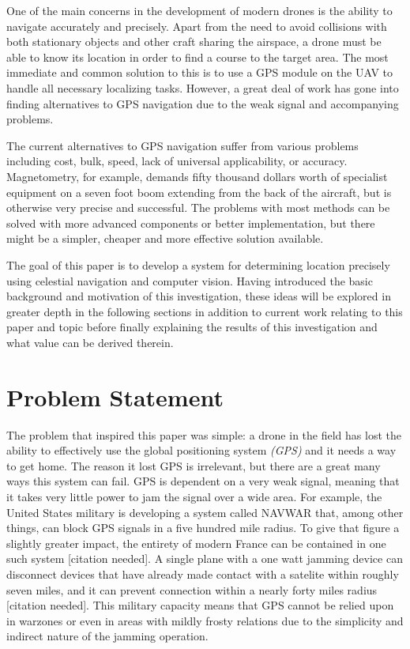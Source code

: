 \documentclass[]{article}
\begin{document}
    One of the main concerns in the development of modern drones is the ability to navigate accurately and precisely. Apart from the need to avoid collisions with both stationary objects and other craft sharing the airspace, a drone must be able to know its location in order to find a course to the target area. The most immediate and common solution to this is to use a GPS module on the UAV to handle all necessary localizing tasks. However, a great deal of work has gone into finding alternatives to GPS navigation due to the weak signal and accompanying problems.\newline
    
    The current alternatives to GPS navigation suffer from various problems including cost, bulk, speed, lack of universal applicability, or accuracy. Magnetometry, for example, demands fifty thousand dollars worth of specialist equipment on a seven foot boom extending from the back of the aircraft, but is otherwise very precise and successful. The problems with most methods can be solved with more advanced components or better implementation, but there might be a simpler, cheaper and more effective solution available. \newline
    
    The goal of this paper is to develop a system for determining location precisely using celestial navigation and computer vision. Having introduced the basic background and motivation of this investigation, these ideas will be explored in greater depth in the following sections in addition to current work relating to this paper and topic before finally explaining the results of this investigation and what value can be derived therein.\newline

\section{Problem Statement}
    The problem that inspired this paper was simple: a drone in the field has lost the ability to effectively use the global positioning system \emph{(GPS)} and it needs a way to get home. The reason it lost GPS is irrelevant, but there are a great many ways this system can fail. GPS is dependent on a very weak signal, meaning that it takes very little power to jam the signal over a wide area. For example, the United States military is developing a system called NAVWAR that, among other things, can block GPS signals in a five hundred mile radius. To give that figure a slightly greater impact, the entirety of modern France can be contained in one such system [citation needed]. A single plane with a one watt jamming device can disconnect devices that have already made contact with a satelite within roughly seven miles, and it can prevent connection within a nearly forty miles radius [citation needed]. This military capacity means that GPS cannot be relied upon in warzones or even in areas with mildly frosty relations due to the simplicity and indirect nature of the jamming operation.\newline
    
\end{document}
